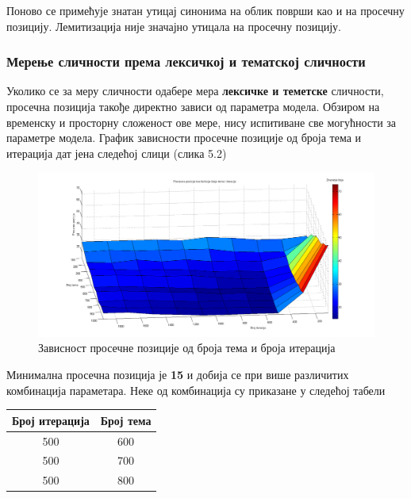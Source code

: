 Поново се примећује знатан утицај синонима на облик површи као и на просечну позицију. Лемитизација није значајно утицала на просечну позицију.



\subsubsection{Мерење сличности према лексичкој и тематској сличности}
	
Уколико се за меру сличности одабере мера  \textbf{лексичке и теметске} сличности, просечна позиција такође директно зависи од параметра модела. Обзиром на временску и просторну сложеност ове мере, нису испитиване све могућности за параметре модела. График зависности просечне позиције од броја тема и итерација дат јена следећој слици (слика 5.2)

		\begin{figure}[H]
    \centering
   \includegraphics[scale=0.3]{./Slike/distLemmSyn.png} 
	\caption{Зависност просечне позиције од броја тема и броја итерација}
	\label{fig:slika1}
\end{figure}

Минимална просечна позиција је \textbf{15} и добија се при више различитих комбинација параметара. Неке од комбинација су приказане у следећој табели

\begin{center}
\begin{tabular}{|c|c|}
\hline
Број итерација & Број тема \\
\hline\hline
500 & 600 \\
500 & 700 \\
500 & 800 \\
\hline
\end{tabular}

\end{center}




